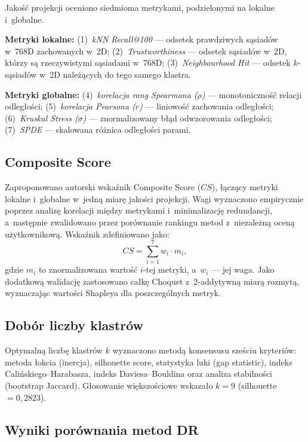 \documentclass[a4paper,11pt,twocolumn]{article}
\begin{document}
Jakość projekcji oceniono siedmioma metrykami, podzielonymi na lokalne
i~globalne.

\textbf{Metryki lokalne:}
(1)~\emph{kNN Recall@100} --- odsetek prawdziwych sąsiadów w~768D
zachowanych w~2D;
(2)~\emph{Trustworthiness} --- odsetek sąsiadów w~2D, którzy są
rzeczywistymi sąsiadami w~768D;
(3)~\emph{Neighbourhood Hit} --- odsetek $k$-sąsiadów w~2D
należących do tego samego klastra.

\textbf{Metryki globalne:}
(4)~\emph{korelacja rang Spearmana ($\rho$)} --- monotoniczność relacji
odległości;
(5)~\emph{korelacja Pearsona ($r$)} --- liniowość zachowania odległości;
(6)~\emph{Kruskal Stress ($\sigma$)} --- znormalizowany błąd
odwzorowania odległości;
(7)~\emph{SPDE} --- skalowana różnica odległości parami.

\subsection{Composite Score}

Zaproponowano autorski wskaźnik Composite Score ($CS$), łączący metryki
lokalne i~globalne w~jedną miarę jakości projekcji. Wagi wyznaczono
empirycznie poprzez analizę korelacji między metrykami i~minimalizację
redundancji, a~następnie zwalidowano przez porównanie rankingu metod
z~niezależną oceną użytkownikową. Wskaźnik zdefiniowano jako:
\begin{equation}
  CS = \sum_{i=1}^{7} w_i \cdot m_i,
  \label{eq:composite}
\end{equation}
gdzie $m_i$ to znormalizowana wartość $i$-tej metryki, a~$w_i$ ---
jej waga. Jako dodatkową walidację zastosowano całkę Choquet
z~2-addytywną miarą rozmytą, wyznaczając wartości Shapleya dla
poszczególnych metryk.

\subsection{Dobór liczby klastrów}

Optymalną liczbę klastrów $k$ wyznaczono metodą konsensusu sześciu
kryteriów: metoda łokcia (inercja), silhouette score, statystyka
luki (gap statistic), indeks Calińskiego--Harabasza, indeks
Daviesa--Bouldina oraz analiza stabilności (bootstrap Jaccard).
Głosowanie większościowe wskazało $k=9$ (silhouette $=0{,}2823$).

\subsection{Wyniki porównania metod DR}
\end{document}

